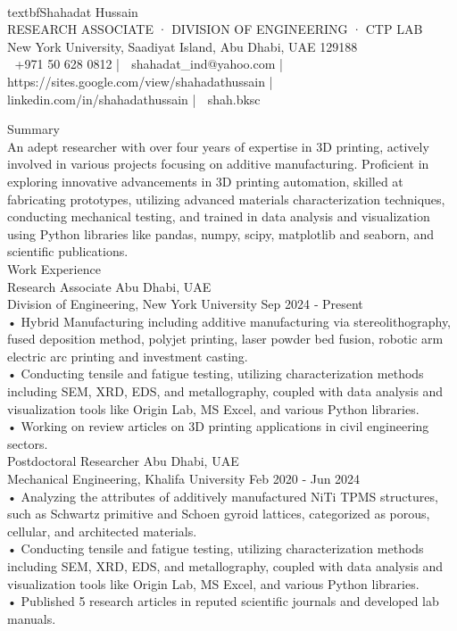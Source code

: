 \documentclass[a4paper]{article}
\begin{document}
\begin{center}

\\textbf{{\LARGE Shahadat Hussain}}\\

RESEARCH ASSOCIATE · DIVISION OF ENGINEERING · CTP LAB \\
New York University, Saadiyat Island, Abu Dhabi, UAE 129188 \\
􀄦 +971 50 628 0812 | 􀄇 shahadat_ind@yahoo.com | 􀁵 https://sites.google.com/view/shahadathussain | 􀁝
linkedin.com/in/shahadathussain | 􀁼 shah.bksc\\

\end{center}

Summary\\
An adept researcher with over four years of expertise in 3D printing, actively involved in various projects focusing on additive
manufacturing. Proficient in exploring innovative advancements in 3D printing automation, skilled at fabricating
prototypes, utilizing advanced materials characterization techniques, conducting mechanical testing, and trained in
data analysis and visualization using Python libraries like pandas, numpy, scipy, matplotlib and seaborn, and scientific
publications.\\

Work Experience\\
Research Associate Abu Dhabi, UAE\\
Division of Engineering, New York University Sep 2024 ‑ Present\\
• Hybrid Manufacturing including additive manufacturing via stereolithography, fused deposition method, polyjet
printing, laser powder bed fusion, robotic arm electric arc printing and investment casting.\\
• Conducting tensile and fatigue testing, utilizing characterization methods including SEM, XRD, EDS, and metallography,
coupled with data analysis and visualization tools like Origin Lab, MS Excel, and various Python libraries.\\
• Working on review articles on 3D printing applications in civil engineering sectors.\\

Postdoctoral Researcher Abu Dhabi, UAE\\
Mechanical Engineering, Khalifa University Feb 2020 ‑ Jun 2024\\
• Analyzing the attributes of additively manufactured NiTi TPMS structures, such as Schwartz primitive and Schoen
gyroid lattices, categorized as porous, cellular, and architected materials.\\
• Conducting tensile and fatigue testing, utilizing characterization methods including SEM, XRD, EDS, and metallography,
coupled with data analysis and visualization tools like Origin Lab, MS Excel, and various Python libraries.\\
• Published 5 research articles in reputed scientific journals and developed lab manuals.\\
\end{document}
